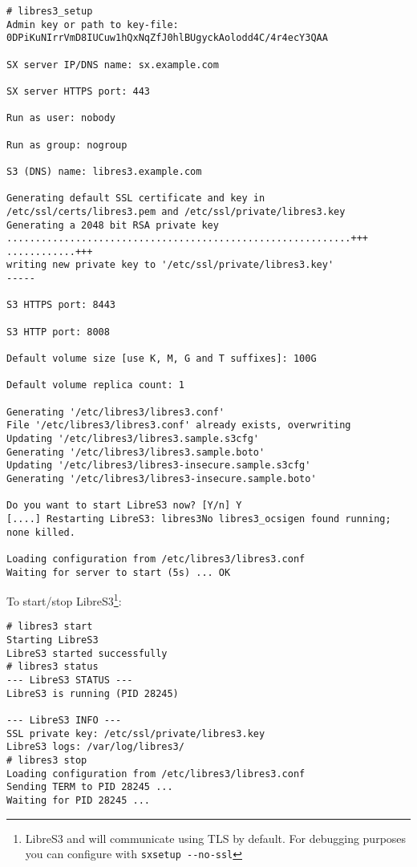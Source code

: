 \begin{lstlisting}
# libres3_setup
Admin key or path to key-file: 0DPiKuNIrrVmD8IUCuw1hQxNqZfJ0hlBUgyckAolodd4C/4r4ecY3QAA

SX server IP/DNS name: sx.example.com

SX server HTTPS port: 443

Run as user: nobody

Run as group: nogroup

S3 (DNS) name: libres3.example.com

Generating default SSL certificate and key in /etc/ssl/certs/libres3.pem and /etc/ssl/private/libres3.key
Generating a 2048 bit RSA private key
............................................................+++
............+++
writing new private key to '/etc/ssl/private/libres3.key'
-----

S3 HTTPS port: 8443

S3 HTTP port: 8008

Default volume size [use K, M, G and T suffixes]: 100G

Default volume replica count: 1

Generating '/etc/libres3/libres3.conf'
File '/etc/libres3/libres3.conf' already exists, overwriting
Updating '/etc/libres3/libres3.sample.s3cfg'
Generating '/etc/libres3/libres3.sample.boto'
Updating '/etc/libres3/libres3-insecure.sample.s3cfg'
Generating '/etc/libres3/libres3-insecure.sample.boto'

Do you want to start LibreS3 now? [Y/n] Y
[....] Restarting LibreS3: libres3No libres3_ocsigen found running; none killed.

Loading configuration from /etc/libres3/libres3.conf
Waiting for server to start (5s) ... OK
\end{lstlisting}


To start/stop LibreS3\footnote{LibreS3 and \SX will communicate using TLS by
default. For debugging purposes you can configure \SX with \verb|sxsetup --no-ssl|}:

\begin{lstlisting}
# libres3 start
Starting LibreS3
LibreS3 started successfully
# libres3 status
--- LibreS3 STATUS ---
LibreS3 is running (PID 28245)

--- LibreS3 INFO ---
SSL private key: /etc/ssl/private/libres3.key
LibreS3 logs: /var/log/libres3/
# libres3 stop
Loading configuration from /etc/libres3/libres3.conf
Sending TERM to PID 28245 ... 
Waiting for PID 28245 ...
\end{lstlisting}


